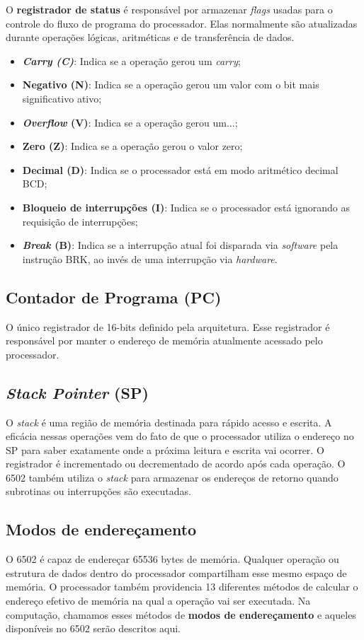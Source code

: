 \documentclass[
	12pt,				  %
	openright,		%
	a4paper,			%
	english,			%
	french,				%
	spanish,			%
	brazil,				%
]{abntex2}
\begin{document}
O \textbf{registrador de status} é responsável por armazenar \emph{flags} usadas
para o controle do fluxo de programa do processador. Elas normalmente são
atualizadas durante operações lógicas, aritméticas e de transferência de dados.
\begin{itemize}
	\item \textbf{\emph{Carry (C)}}: Indica se a operação gerou um \emph{carry};
	\item \textbf{Negativo (N)}: Indica se a operação gerou um valor com o bit
	      mais significativo ativo;
	\item \textbf{\emph{Overflow} (V)}: Indica se a operação gerou um...;
	\item \textbf{Zero (Z)}: Indica se a operação gerou o valor zero;
	\item \textbf{Decimal (D)}: Indica se o processador está em modo aritmético
	      decimal BCD;
	\item \textbf{Bloqueio de interrupções (I)}: Indica se o processador está
	      ignorando as requisição de interrupções;
	\item \textbf{\emph{Break} (B)}: Indica se a interrupção atual foi disparada
	      via \emph{software} pela instrução BRK, ao invés de uma interrupção via
	      \emph{hardware}.
\end{itemize}

\subsection{Contador de Programa (PC)}
O único registrador de 16-bits definido pela arquitetura. Esse registrador é
responsável por manter o endereço de memória atualmente acessado pelo
processador.

\subsection{\emph{Stack Pointer} (SP)}
O \emph{stack} é uma região de memória destinada para rápido acesso e escrita.
A eficácia nessas operações vem do fato de que o processador utiliza o endereço
no SP para saber exatamente onde a próxima leitura e escrita vai ocorrer.
O registrador é incrementado ou decrementado de acordo após cada operação. O
6502 também utiliza o \emph{stack} para armazenar os endereços de retorno quando
subrotinas ou interrupções são executadas.

\subsection{Modos de endereçamento}
O 6502 é capaz de endereçar 65536 bytes de memória. Qualquer operação ou
estrutura de dados dentro do processador compartilham esse mesmo espaço de
memória. O processador também providencia 13 diferentes métodos de calcular o
endereço efetivo de memória na qual a operação vai ser executada. Na computação,
chamamos esses métodos de \textbf{modos de endereçamento} e aqueles disponíveis
no 6502 serão descritos aqui.
\end{document}
